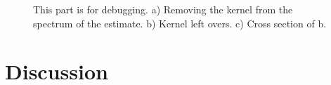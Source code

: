 \documentclass[conference]{IEEEtran}
\begin{document}
\begin{figure}[t!]
{	\label{fig:KernelLeftOversCrossSection}}
	\caption{This part is for debugging. a) Removing the kernel from the spectrum of the estimate. b) Kernel left overs. c) Cross section of b.}
\end{figure}



\section{Discussion}

 
%
%

\end{document}
